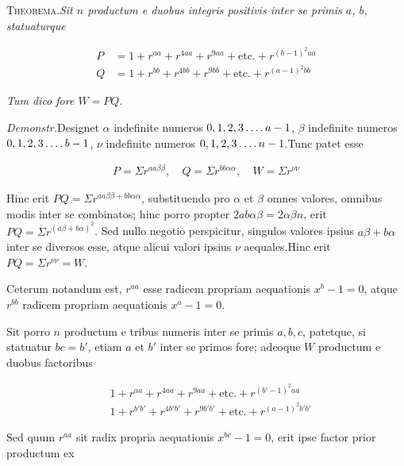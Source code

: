 
\textsc{Theorema.}\quad \textit{Sit $n$ productum e duobus integris positivis inter se primis $a$, $b$,} \textit{statuaturque}

\[
\begin{aligned}
P&=1+ r^{aa}+r^{4aa}+r^{9aa}+\text{etc.}+r^{(b-1)^2aa}\\
Q&=1+r^{bb}+r^{4bb}+r^{9bb}+\text{etc.}+r^{(a-1)^2bb}
\end{aligned}
\]

\textit{Tum dico fore $W=PQ$.}

\textit{Demonstr.}\quad Designet $\alpha$ indefinite numeros $0,1,2,3\mathinner{.\,.\,.\,.} a-1$, $\beta$ indefinite numeros $0,1,2,3\mathinner{.\,.\,.\,.} b-1$, $\nu$ indefinite numeros $0,1,2,3\mathinner{.\,.\,.\,.} n-1$.\quad Tunc patet esse

\[
\begin{aligned}
P=\Sigma r^{aa\beta\beta},\quad Q=\Sigma r^{bb\alpha\alpha},\quad W=\Sigma r^{\nu\nu}
\end{aligned}
\]

Hinc erit $PQ=\Sigma r^{aa\beta\beta+bb\alpha\alpha}$, substituendo pro $\alpha$ et $\beta$ omnes valores, omnibus modis inter se combinatos; hinc porro propter $2ab\alpha\beta=2\alpha\beta n$, erit $PQ=\Sigma r^{(a\beta+b\alpha)^2}$. Sed nullo negotio perspicitur, singulos valores ipsius $a\beta+b\alpha$ inter se diversos esse, atque alicui valori ipsius $\nu$ aequales.\quad Hinc erit $PQ=\Sigma r^{\nu\nu}=W$.

Ceterum notandum est, $r^{aa}$ esse radicem propriam aequationis $x^b-1=0$, atque $r^{bb}$ radicem propriam aequationis $x^a-1=0$.

%

Sit porro $n$ productum e tribus numeris inter se primis $a,b,c$, patetque, si statuatur $bc=b'$, etiam $a$ et $b'$ inter se primos fore; adeoque $W$ productum e duobus factoribus

\[
\begin{aligned}
&1+r^{aa}+r^{4aa}+r^{9aa}+\text{etc.}+r^{(b'-1)^2aa}\\
&1+r^{b'b'}+r^{4b'b'}+r^{9b'b'}+\text{etc.}+r^{(a-1)^2b'b'}
\end{aligned}
\]

Sed quum $r^{aa}$ sit radix propria aequationis $x^{bc}-1=0$, erit ipse factor prior productum ex

